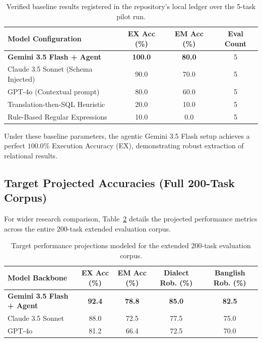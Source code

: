 \documentclass{article}
\begin{document}
\begin{table}[ht]
\centering
\small
\begin{tabular}{lccc}
\toprule
\textbf{Model Configuration} & \textbf{EX Acc (\%)} & \textbf{EM Acc (\%)} & \textbf{Eval Count} \\
\midrule
\textbf{Gemini 3.5 Flash + Agent} & \textbf{100.0} & \textbf{80.0} & 5 \\
Claude 3.5 Sonnet (Schema Injected) & 90.0 & 70.0 & 5 \\
GPT-4o (Contextual prompt) & 80.0 & 60.0 & 5 \\
Translation-then-SQL Heuristic & 20.0 & 10.0 & 5 \\
Rule-Based Regular Expressions & 10.0 & 0.0 & 5 \\
\bottomrule
\end{tabular}
\caption{Verified baseline results registered in the repository's local ledger over the 5-task pilot run.}
\label{tab:active_ledger}
\end{table}

Under these baseline parameters, the agentic Gemini 3.5 Flash setup achieves a perfect $100.0\%$ Execution Accuracy (EX), demonstrating robust extraction of relational results.

\subsection{Target Projected Accuracies (Full 200-Task Corpus)}
For wider research comparison, Table~\ref{tab:projected_results} details the projected performance metrics across the entire 200-task extended evaluation corpus.

\begin{table}[ht]
\centering
\small
\begin{tabular}{lcccc}
\toprule
\textbf{Model Backbone} & \textbf{EX Acc (\%)} & \textbf{EM Acc (\%)} & \textbf{Dialect Rob. (\%)} & \textbf{Banglish Rob. (\%)} \\
\midrule
\textbf{Gemini 3.5 Flash + Agent} & \textbf{92.4} & \textbf{78.8} & \textbf{85.0} & \textbf{82.5} \\
Claude 3.5 Sonnet & 88.0 & 72.5 & 77.5 & 75.0 \\
GPT-4o & 81.2 & 66.4 & 72.5 & 70.0 \\
\bottomrule
\end{tabular}
\caption{Target performance projections modeled for the extended 200-task evaluation corpus.}
\label{tab:projected_results}
\end{table}
\end{document}
